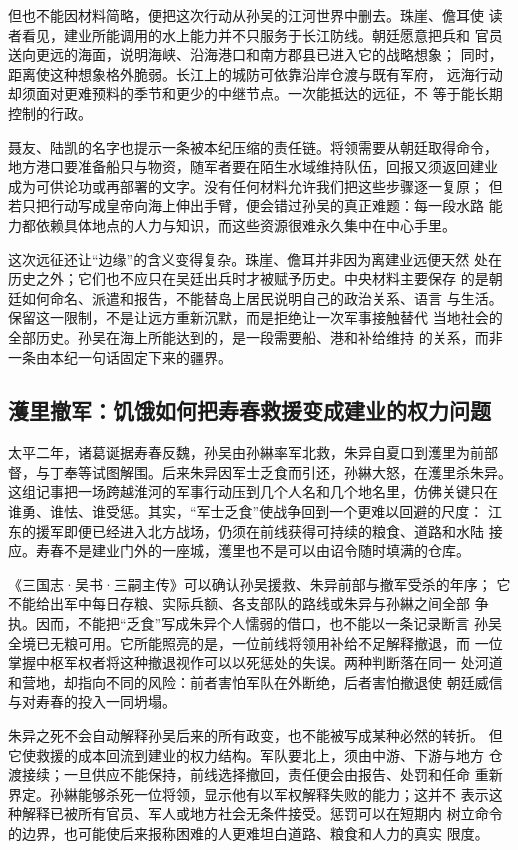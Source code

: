 但也不能因材料简略，便把这次行动从孙吴的江河世界中删去。珠崖、儋耳使
读者看见，建业所能调用的水上能力并不只服务于长江防线。朝廷愿意把兵和
官员送向更远的海面，说明海峡、沿海港口和南方郡县已进入它的战略想象；
同时，距离使这种想象格外脆弱。长江上的城防可依靠沿岸仓渡与既有军府，
远海行动却须面对更难预料的季节和更少的中继节点。一次能抵达的远征，不
等于能长期控制的行政。

聂友、陆凯的名字也提示一条被本纪压缩的责任链。将领需要从朝廷取得命令，
地方港口要准备船只与物资，随军者要在陌生水域维持队伍，回报又须返回建业
成为可供论功或再部署的文字。没有任何材料允许我们把这些步骤逐一复原；
但若只把行动写成皇帝向海上伸出手臂，便会错过孙吴的真正难题：每一段水路
能力都依赖具体地点的人力与知识，而这些资源很难永久集中在中心手里。

这次远征还让“边缘”的含义变得复杂。珠崖、儋耳并非因为离建业远便天然
处在历史之外；它们也不应只在吴廷出兵时才被赋予历史。中央材料主要保存
的是朝廷如何命名、派遣和报告，不能替岛上居民说明自己的政治关系、语言
与生活。保留这一限制，不是让远方重新沉默，而是拒绝让一次军事接触替代
当地社会的全部历史。孙吴在海上所能达到的，是一段需要船、港和补给维持
的关系，而非一条由本纪一句话固定下来的疆界。

\subsection{濩里撤军：饥饿如何把寿春救援变成建业的权力问题}

太平二年，诸葛诞据寿春反魏，孙吴由孙綝率军北救，朱异自夏口到濩里为前部
督，与丁奉等试图解围。后来朱异因军士乏食而引还，孙綝大怒，在濩里杀朱异。
这组记事把一场跨越淮河的军事行动压到几个人名和几个地名里，仿佛关键只在
谁勇、谁怯、谁受惩。其实，“军士乏食”使战争回到一个更难以回避的尺度：
江东的援军即便已经进入北方战场，仍须在前线获得可持续的粮食、道路和水陆
接应。寿春不是建业门外的一座城，濩里也不是可以由诏令随时填满的仓库。

《三国志·吴书·三嗣主传》可以确认孙吴援救、朱异前部与撤军受杀的年序；
它不能给出军中每日存粮、实际兵额、各支部队的路线或朱异与孙綝之间全部
争执。因而，不能把“乏食”写成朱异个人懦弱的借口，也不能以一条记录断言
孙吴全境已无粮可用。它所能照亮的是，一位前线将领用补给不足解释撤退，而
一位掌握中枢军权者将这种撤退视作可以以死惩处的失误。两种判断落在同一
处河道和营地，却指向不同的风险：前者害怕军队在外断绝，后者害怕撤退使
朝廷威信与对寿春的投入一同坍塌。

朱异之死不会自动解释孙吴后来的所有政变，也不能被写成某种必然的转折。
但它使救援的成本回流到建业的权力结构。军队要北上，须由中游、下游与地方
仓渡接续；一旦供应不能保持，前线选择撤回，责任便会由报告、处罚和任命
重新界定。孙綝能够杀死一位将领，显示他有以军权解释失败的能力；这并不
表示这种解释已被所有官员、军人或地方社会无条件接受。惩罚可以在短期内
树立命令的边界，也可能使后来报称困难的人更难坦白道路、粮食和人力的真实
限度。


